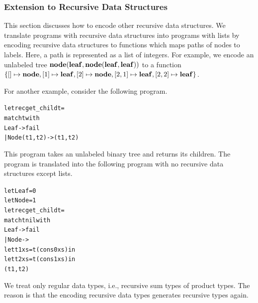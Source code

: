 


\subsubsection{Extension to Recursive Data Structures}
This section discusses how to encode other recursive data structures.
We translate programs with recursive data structures into programs
with lists by encoding recursive data structures to functions which maps
paths of nodes to labels.  Here, a path is represented as a list of integers.
For example, we encode an unlabeled tree
$\mathbf{node}({\mathbf{leaf}},{\mathbf{node}({\mathbf{leaf}},{\mathbf{leaf}})})$ to a function
$\{[] \mapsto \mathbf{node}, [1] \mapsto \mathbf{leaf}, [2] \mapsto \mathbf{node}, [2,1] \mapsto \mathbf{leaf}, [2,2] \mapsto \mathbf{leaf}\}$.

For another example, consider the following program.
\begin{alltt}
let rec get_child t =
  match t with
    Leaf -> fail
  | Node(t1,t2) -> (t1, t2)
\end{alltt}
This program takes an unlabeled binary tree and returns its children.
The program is translated into the following program with no recursive
data structures except lists.
\begin{alltt}
let Leaf = 0
let Node = 1
let rec get_child t =
  match t nil with
    Leaf -> fail
  | Node ->
      let t1 xs = t (cons 0 xs) in
      let t2 xs = t (cons 1 xs) in
        (t1, t2)
\end{alltt}

We treat only regular data types, i.e., recursive sum types of product types.
The reason is that the encoding recursive data types generates recursive types again.

